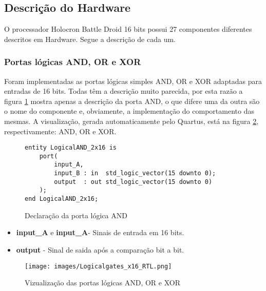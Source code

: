 \documentclass{article}
\newcommand\tab[1][0.50cm]{\hspace*{#1}}
\begin{document}
		\subsection{Descri\c{c}\~{a}o do Hardware}
			\tab O processador Holocron Battle Droid 16 bits possui 27 componentes diferentes descritos em Hardware. Segue a descri\c{c}\~{a}o de cada um.
			\subsubsection{Portas l\'{o}gicas AND, OR e XOR}
			\tab Foram implementadas as portas l\'{o}gicas simples AND, OR e XOR adaptadas para entradas de 16 bits. Todas t\^{e}m a descri\c{c}\~{a}o muito parecida, por esta raz\~{a}o a figura \ref{fig:LogicalAND_2x16} mostra apenas a descri\c{c}\~{a}o da porta AND, o que difere uma da outra s\~{a}o o nome do componente e, obviamente, a implementa\c{c}\~{a}o do comportamento das mesmas. A visualiza\c{c}\~{a}o, gerada automaticamente pelo Quartus, est\'{a} na figura \ref{fig:Logicalgates_x16_RTL}, respectivamente: AND, OR e XOR.
			\begin{figure}[H]
				\centering
				\caption[Portas l\'{o}gicas]{Declara\c{c}\~{a}o da porta l\'{o}gica AND}
				\label{fig:LogicalAND_2x16}
				\begin{lstlisting}[style=vhdl]
entity LogicalAND_2x16 is
	port( 
		input_A, 
		input_B : in  std_logic_vector(15 downto 0);
		output  : out std_logic_vector(15 downto 0)
	);
end LogicalAND_2x16;
				\end{lstlisting}
			\end{figure}
			\begin{itemize}
				\item \textbf{input\_A} e \textbf{input\_A}- Sinais de entrada em 16 bits.
				\item \textbf{output} - Sinal de saida ap\'{o}s a compara\c{c}\~{a}o bit a bit.
			\end{itemize}
			\begin{figure}[H]
				\centering
				\caption[Vizualiza\c{c}\~{a}o das portas l\'{o}gicas]{Vizualiza\c{c}\~{a}o das portas l\'{o}gicas AND, OR e XOR\\}
				\label{fig:Logicalgates_x16_RTL}
				\texttt{[image: images/Logicalgates\_x16\_RTL.png]}
			\end{figure}
\end{document}

